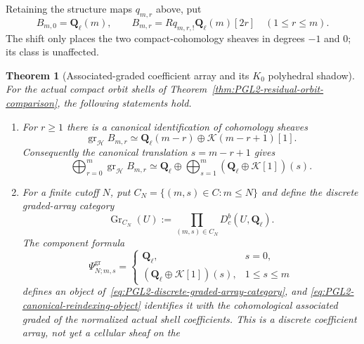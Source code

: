 \documentclass[11pt]{article}
\newtheorem{theorem}{Theorem}[section]
\theoremstyle{definition}
\theoremstyle{remark}
\newcommand{\Qell}{\mathbf Q_\ell}
\newcommand{\cK}{\mathcal K}
\begin{document}
Retaining the structure maps $q_{m,r}$ above, put
\begin{equation}
 B_{m,0}=\Qell(m),\qquad
 B_{m,r}=Rq_{m,r,!}\Qell(m)[2r]\quad(1\le r\le m).
 \label{eq:PGL2-normalized-shell-complexes}
\end{equation}
The shift only places the two compact-cohomology sheaves in degrees $-1$ and
$0$; its class is unaffected.

\begin{theorem}[Associated-graded coefficient array and its $K_0$ polyhedral shadow]
\label{thm:PGL2-narrow-skeletonization}
For the actual compact orbit shells of
Theorem~\ref{thm:PGL2-residual-orbit-comparison}, the following statements
hold.
\begin{enumerate}[label=\textup{(\roman*)}]
\item For $r\ge1$ there is a canonical identification of cohomology sheaves
  \begin{equation}
   \operatorname{gr}_{\mathcal H}B_{m,r}
   \simeq
   \Qell(m-r)\oplus\cK(m-r+1)[1].
   \label{eq:PGL2-shell-cohomology-graded}
  \end{equation}
  Consequently the canonical translation $s=m-r+1$ gives
  \begin{equation}
   \bigoplus_{r=0}^m\operatorname{gr}_{\mathcal H}B_{m,r}
   \simeq
   \Qell\oplus
   \bigoplus_{s=1}^m(\Qell\oplus\cK[1])(s).
   \label{eq:PGL2-canonical-reindexing-object}
  \end{equation}
\item For a finite cutoff $N$, put
  $C_N=\{(m,s)\in C:m\le N\}$ and define the discrete graded-array category
  \begin{equation}
   \operatorname{Gr}_{C_N}(U)
   :=\prod_{(m,s)\in C_N}D_c^b(U,\Qell).
   \label{eq:PGL2-discrete-graded-array-category}
  \end{equation}
  The component formula
  \begin{equation}
   \Psi^{\operatorname{gr}}_{N;m,s}
   =
   \begin{cases}
    \Qell,&s=0,\\
    (\Qell\oplus\cK[1])(s),&1\le s\le m
   \end{cases}
   \label{eq:PGL2-discrete-graded-array}
  \end{equation}
  defines an object of~\eqref{eq:PGL2-discrete-graded-array-category}, and
  \eqref{eq:PGL2-canonical-reindexing-object} identifies it with the
  cohomological associated graded of the normalized actual shell coefficients.
  This is a discrete coefficient array, not yet a cellular sheaf on the

\end{enumerate}
\end{theorem}
\end{document}
